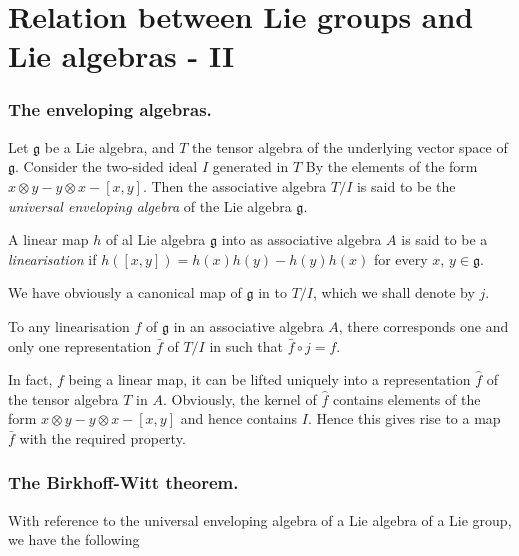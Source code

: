 
 \chapter{Relation between Lie groups and Lie algebras -
   II}\label{chap4}%

\setcounter{section}{4}
\setcounter{subsection}{0} 
\subsection{The enveloping
  algebras.}\label{chap4-sec4.1}\pageoriginale%

Let $\mathfrak{g}$ be a Lie algebra, and $T$ the tensor algebra of the
underlying vector space of $\mathfrak{g}$. Consider the two-sided ideal
$I$ generated in $T$  By the elements of the form  $x\otimes y-
 y \otimes x -[x,y]$. Then the associative algebra $T/I$ is said to
be the \textit{universal enveloping algebra} of the Lie algebra
$\mathfrak{g}$. 

\begin{defi*}%
A linear map $h$ of al Lie algebra $\mathfrak{g}$ into as associative
algebra $A$ is said to be a {\em linearisation} if
$h([x,y])=h(x)h(y)-h(y)h(x)$ for every $x$, $y \in \mathfrak{g}$. 
\end{defi*}

We have obviously a canonical map of $\mathfrak{g}$ in to $T/I$, which we
shall denote by $j$. 

\setcounter{proposition}{0}
\begin{proposition}\label{chap4-prop1}%
 To any linearisation $f$ of $\mathfrak{g}$ in an associative algebra
 $A$, there corresponds one and only one representation
 $\bar{f}$ of $T/I$ in such that $\bar{f}\circ j=f$. 
\end{proposition}

In fact, $f$ being a linear map, it can be lifted uniquely into a
representation $\hat{f}$ of the tensor algebra  $T$ in $A$. Obviously,
the kernel of $\hat{f}$ contains elements of the form $x \otimes y - y
\otimes x - [x , y]$ and hence contains $I$. Hence this gives rise to
a map $\bar{f}$ with the required property.  

\subsection{The Birkhoff-Witt theorem.}\label{chap4-sec4.2}%

With reference to the universal enveloping algebra of a Lie algebra of
a Lie group, we have the following 

